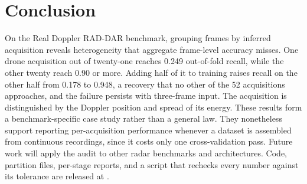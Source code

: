 \documentclass[conference]{IEEEtran}
\begin{document}
\section{Conclusion}

On the Real Doppler RAD-DAR benchmark, grouping frames by inferred acquisition reveals heterogeneity that aggregate frame-level accuracy misses. One drone acquisition out of twenty-one reaches 0.249 out-of-fold recall, while the other twenty reach 0.90 or more. Adding half of it to training raises recall on the other half from 0.178 to 0.948, a recovery that no other of the 52 acquisitions approaches, and the failure persists with three-frame input. The acquisition is distinguished by the Doppler position and spread of its energy. These results form a benchmark-specific case study rather than a general law. They nonetheless support reporting per-acquisition performance whenever a dataset is assembled from continuous recordings, since it costs only one cross-validation pass. Future work will apply the audit to other radar benchmarks and architectures. Code, partition files, per-stage reports, and a script that rechecks every number against its tolerance are released at \codeurl{}.
\end{document}

